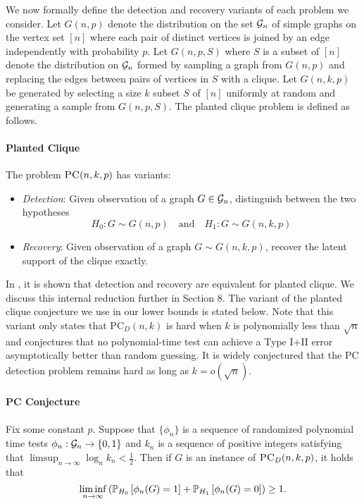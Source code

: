 \documentclass[11pt]{article}
\begin{document}
We now formally define the detection and recovery variants of each problem we consider. Let $G(n, p)$ denote the distribution on the set $\mathcal{G}_n$ of simple graphs on the vertex set $[n]$ where each pair of distinct vertices is joined by an edge independently with probability $p$. Let $G(n, p, S)$ where $S$ is a subset of $[n]$ denote the distribution on $\mathcal{G}_n$ formed by sampling a graph from $G(n, p)$ and replacing the edges between pairs of vertices in $S$ with a clique. Let $G(n, k, p)$ be generated by selecting a size $k$ subset $S$ of $[n]$ uniformly at random and generating a sample from $G(n, p, S)$. The planted clique problem is defined as follows.

\paragraph{Planted Clique} The problem $\textsc{PC}(n, k, p)$ has variants:
\begin{itemize}
\item \emph{Detection}: Given observation of a graph $G \in \mathcal{G}_n$, distinguish between the two hypotheses
$$H_0: G \sim G(n, p) \quad \text{and} \quad H_1 : G \sim G(n, k, p)$$
\item \emph{Recovery}: Given observation of a graph $G \sim G(n, k, p)$, recover the latent support of the clique exactly.
\end{itemize}

In \cite{alon2007testing}, it is shown that detection and recovery are equivalent for planted clique. We discuss this internal reduction further in Section 8. The variant of the planted clique conjecture we use in our lower bounds is stated below. Note that this variant only states that $\text{PC}_D(n, k)$ is hard when $k$ is polynomially less than $\sqrt{n}$ and conjectures that no polynomial-time test can achieve a Type I$+$II error asymptotically better than random guessing. It is widely conjectured that the PC detection problem remains hard as long as $k = o(\sqrt{n})$.

\paragraph{PC Conjecture} Fix some constant $p$. Suppose that $\{ \phi_n \}$ is a sequence of randomized polynomial time tests $\phi_n : \mathcal{G}_n \to \{0, 1\}$ and $k_n$ is a sequence of positive integers satisfying that $\limsup_{n \to \infty} \log_n k_n < \frac{1}{2}$. Then if $G$ is an instance of $\textsc{PC}_D(n, k, p)$, it holds that
$$\liminf_{n \to \infty} \left( \mathbb{P}_{H_0}\left[\phi_n(G) = 1\right] + \mathbb{P}_{H_1}\left[\phi_n(G) = 0\right] \right) \ge 1.$$
\end{document}
